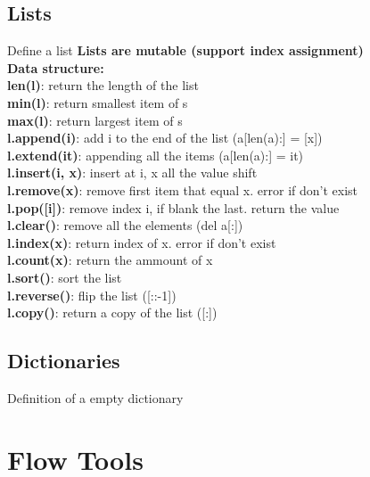 \documentclass{cheatsheet}
\begin{document}
    \subsection{Lists}
    Define a list
    \textbf{Lists are mutable (support index assignment)} \\
    \vspace{0.2cm} 
    \textbf{Data structure:} \\
    \textbf{len(l)}: return the length of the list \\
    \textbf{min(l)}: return smallest item of s \\
    \textbf{max(l)}: return largest item of s \\
    \textbf{l.append(i)}: add i to the end of the list (a[len(a):] = [x]) \\
    \textbf{l.extend(it)}: appending all the items (a[len(a):] = it) \\
    \textbf{l.insert(i, x)}: insert at i, x all the value shift \\
    \textbf{l.remove(x)}: remove first item that equal x. error if don't exist\\
    \textbf{l.pop([i])}: remove index i, if blank the last. return the value \\
    \textbf{l.clear()}: remove all the elements (del a[:])\\
    \textbf{l.index(x)}: return index of x. error if don't exist \\
    \textbf{l.count(x)}: return the ammount of x \\
    \textbf{l.sort()}: sort the list \\
    \textbf{l.reverse()}: flip the list ([::-1]) \\
    \textbf{l.copy()}: return a copy of the list ([:])

    \subsection{Dictionaries}
    Definition of a empty dictionary
\section{Flow Tools}
\end{document}
